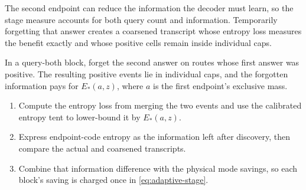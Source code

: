 The second endpoint can reduce the information the decoder must
learn, so the stage measure accounts for both query count and
information. Temporarily forgetting that answer creates a coarsened
transcript whose entropy loss measures the benefit exactly and whose
positive cells remain inside individual caps.
\begin{claim}
\label{clm:expected-coarsening}
In a query-both block, forget the second answer on routes whose first
answer was positive. The resulting positive events lie in individual
caps, and the forgotten information pays for $E_*(a,z)$, where $a$
is the first endpoint's exclusive mass.
\end{claim}
\begin{proofstrategy}
\begin{enumerate}
\item Compute the entropy loss from merging the two events and use the
      calibrated entropy tent to lower-bound it by $E_*(a,z)$.
\item Express endpoint-code entropy as the information left after
      discovery, then compare the actual and coarsened transcripts.
\item Combine that information difference with the physical mode
      savings, so each block's saving is charged once in
      \eqref{eq:adaptive-stage}.
\end{enumerate}
\end{proofstrategy}
